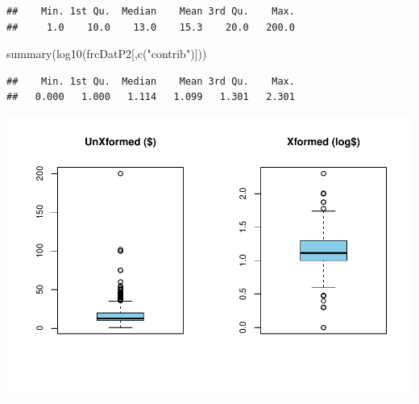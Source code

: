 \documentclass[
]{article}
\newenvironment{Shaded}{\begin{snugshade}}{\end{snugshade}}
\newcommand{\AttributeTok}[1]{\textcolor[rgb]{0.77,0.63,0.00}{#1}}
\newcommand{\CommentTok}[1]{\textcolor[rgb]{0.56,0.35,0.01}{\textit{#1}}}
\newcommand{\DecValTok}[1]{\textcolor[rgb]{0.00,0.00,0.81}{#1}}
\newcommand{\FunctionTok}[1]{\textcolor[rgb]{0.00,0.00,0.00}{#1}}
\newcommand{\NormalTok}[1]{#1}
\newcommand{\OtherTok}[1]{\textcolor[rgb]{0.56,0.35,0.01}{#1}}
\newcommand{\StringTok}[1]{\textcolor[rgb]{0.31,0.60,0.02}{#1}}
\begin{document}
\begin{verbatim}
##    Min. 1st Qu.  Median    Mean 3rd Qu.    Max. 
##     1.0    10.0    13.0    15.3    20.0   200.0
\end{verbatim}

\begin{Shaded}
\begin{Highlighting}[]
\FunctionTok{summary}\NormalTok{(}\FunctionTok{log10}\NormalTok{(frcDatP2[,}\FunctionTok{c}\NormalTok{(}\StringTok{"contrib"}\NormalTok{)]))}
\end{Highlighting}
\end{Shaded}

\begin{verbatim}
##    Min. 1st Qu.  Median    Mean 3rd Qu.    Max. 
##   0.000   1.000   1.114   1.099   1.301   2.301
\end{verbatim}

\begin{Shaded}
\end{Shaded}

\includegraphics{linear_regression__uc_files/figure-latex/Problem2_Q2-1.pdf}
\end{document}
